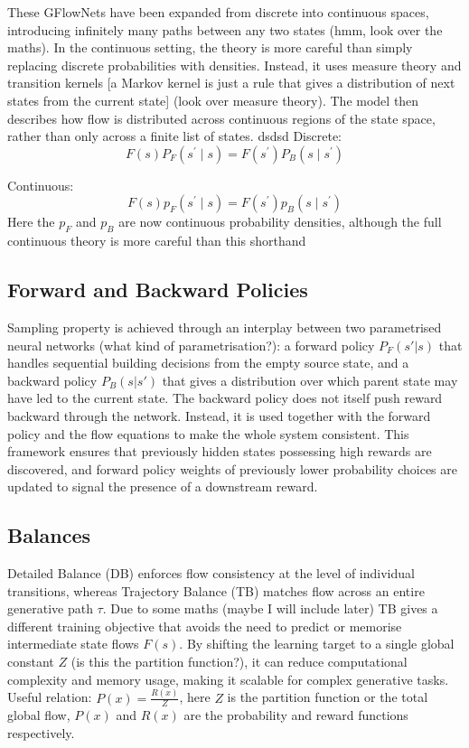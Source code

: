 \documentclass{article}
\begin{document}
These GFlowNets have been expanded from discrete into continuous spaces, introducing infinitely many paths between any two states (hmm, look over the maths). In the continuous setting, the theory is more careful than simply replacing discrete probabilities with densities. Instead, it uses measure theory and transition kernels [a Markov kernel is just a rule that gives a distribution of next states from the current state] (look over measure theory). The model then describes how flow is distributed across continuous regions of the state space, rather than only across a finite list of states.
dsdsd
Discrete:
\begin{equation}
F(s)P_{F}(s^{\prime }\mid s)=F(s^{\prime })P_{B}(s\mid s^{\prime })
\end{equation}

Continuous:
\begin{equation}
F(s)p_{F}(s^{\prime }\mid s)=F(s^{\prime })p_{B}(s\mid s^{\prime })
\end{equation}
Here the $p_F$ and $p_B$ are now continuous probability densities, although the full continuous theory is more careful than this shorthand

\subsection{Forward and Backward Policies}
Sampling property is achieved through an interplay between two parametrised neural networks (what kind of parametrisation?): a forward policy $P_F(s'|s)$ that handles sequential building decisions from the empty source state, and a backward policy $P_B(s|s')$ that gives a distribution over which parent state may have led to the current state. The backward policy does not itself push reward backward through the network. Instead, it is used together with the forward policy and the flow equations to make the whole system consistent. This framework ensures that previously hidden states possessing high rewards are discovered, and forward policy weights of previously lower probability choices are updated to signal the presence of a downstream reward.



\subsection{Balances}
Detailed Balance (DB) enforces flow consistency at the level of individual transitions, whereas Trajectory Balance (TB) matches flow across an entire generative path $\tau$. Due to some maths (maybe I will include later) TB gives a different training objective that avoids the need to predict or memorise intermediate state flows $F(s)$. By shifting the learning target to a single global constant $Z$ (is this the partition function?), it can reduce computational complexity and memory usage, making it scalable for complex generative tasks. Useful relation: $P(x) = \frac{R(x)}{Z}$, here $Z$ is the partition function or the total global flow, $P(x)$ and $R(x)$ are the probability and reward functions respectively.
\end{document}
